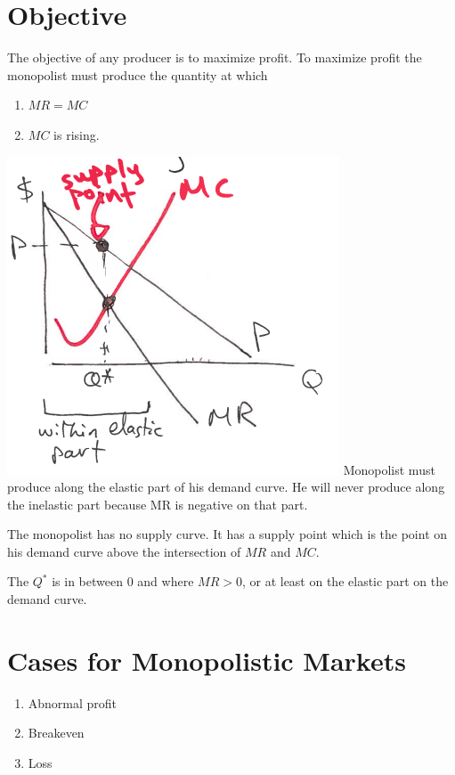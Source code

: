 \documentclass[../ECON-281-Notes.tex]{subfiles}
\begin{document}
\section{Objective}
The objective of any producer is to maximize profit. 
To maximize profit the monopolist must produce the quantity at which 
\begin{enumerate}
    \item \(MR = MC\)
    \item \(MC\) is rising.
\end{enumerate}


\includegraphics[width=\columnwidth]{assets/image_2021-11-23-12-09-44.png}
Monopolist must produce along the elastic part of his demand curve.
He will never produce along the inelastic part because MR is negative on that part.

\begin{Note}
    The monopolist has no supply curve. It has a supply point which is the point on his demand curve above the intersection of \(MR\) and \(MC\). 
\end{Note}

The \(Q^*\) is in between 0 and where \(MR > 0\), or at least on the elastic part on the demand curve. 

\section{Cases for Monopolistic Markets}
\begin{enumerate}
    \item Abnormal profit 
    \item Breakeven  
    \item Loss  
\end{enumerate}
\end{document}

